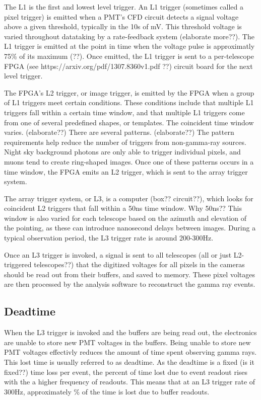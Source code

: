 The L1 is the first and lowest level trigger.
An L1 trigger (sometimes called a pixel trigger) is emitted when a PMT's CFD circuit detects a signal voltage above a given threshold, typically in the 10s of mV.
This threshold voltage is varied throughout datataking by a rate-feedback system (elaborate more??).
The L1 trigger is emitted at the point in time when the voltage pulse is approximatly 75\% of its maximum (??).
Once emitted, the L1 trigger is sent to a per-telescope FPGA (see https://arxiv.org/pdf/1307.8360v1.pdf ??) circuit board for the next level trigger.

The FPGA's L2 trigger, or image trigger, is emitted by the FPGA when a group of L1 triggers meet certain conditions.
These conditions include that multiple L1 triggers fall within a certain time window, and that multiple L1 triggers come from one of several predefined shapes, or templates.
The coincident time window varies. (elaborate??)
There are several patterns. (elaborate??)
The pattern requirements help reduce the number of triggers from non-gamma-ray sources.
Night sky background photons are only able to trigger individual pixels, and muons tend to create ring-shaped images.
Once one of these patterns occurs in a time window, the FPGA emits an L2 trigger, which is sent to the array trigger system.

The array trigger system, or L3, is a computer (box?? circuit??), which looks for coincident L2 triggers that fall within a \nicetilde50ns time window.
Why 50ns??
This window is also varied for each telescope based on the azimuth and elevation of the pointing, as these can introduce nanosecond delays between images.
During a typical observation period, the L3 trigger rate is around 200-300Hz.

Once an L3 trigger is invoked, a signal is sent to all telescopes (all or just L2-triggered telescopes??) that the digitized voltages for all pixels in the cameras should be read out from their buffers, and saved to memory.
These pixel voltages are then processed by the analysis software to reconstruct the gamma ray events.



\subsection{Deadtime}
When the L3 trigger is invoked and the buffers are being read out, the electronics are unable to store new PMT voltages in the buffers.
Being unable to store new PMT voltages effectivly reduces the amount of time spent observing gamma rays.
This lost time is usually referred to as deadtime.
As the deadtime is a fixed (is it fixed??) time loss per event, the percent of time lost due to event readout rises with the a higher frequency of readouts.
This means that at an L3 trigger rate of \nicetilde300Hz, approximately \% of the time is lost due to buffer readouts.

